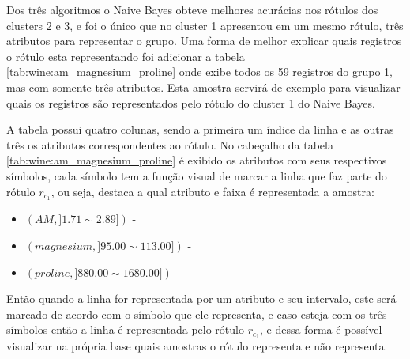 Dos três algoritmos o Naive Bayes  obteve melhores acurácias nos rótulos dos clusters 2 e 3, e foi o único que no cluster 1 apresentou em um mesmo rótulo, três atributos para representar o grupo. Uma forma de melhor explicar quais registros o rótulo esta representando foi adicionar a tabela \ref{tab:wine:am_magnesium_proline} onde exibe todos os 59 registros do grupo 1, mas com somente três atributos. Esta amostra servirá de exemplo  para visualizar quais os registros são representados pelo rótulo do cluster 1 do Naive Bayes. 

A tabela possui quatro colunas, sendo a primeira um índice da linha e as outras três os atributos correspondentes ao rótulo. No cabeçalho da tabela \ref{tab:wine:am_magnesium_proline} é exibido os atributos com seus respectivos símbolos, cada símbolo tem a função visual de marcar a linha que faz parte do rótulo ${r_{c_1}}$, ou seja, destaca a qual atributo e faixa é representada a amostra:

\begin{itemize}[noitemsep]
\item ${(AM, ] 1.71  \sim  2.89])}$ - \Square
\item ${(magnesium, ] 95.00 \sim  113.00])}$ - \XBox
\item ${(proline, ] 880.00 \sim 1680.00]) }$ - \Circle
\end{itemize}

\newpage
Então quando a linha for representada por um atributo e seu intervalo, este será marcado de acordo com o símbolo que ele representa, e caso esteja com os três símbolos então a linha é representada pelo rótulo ${r_{c_1}}$, e dessa forma é possível visualizar na própria base quais amostras o rótulo representa e não representa.


